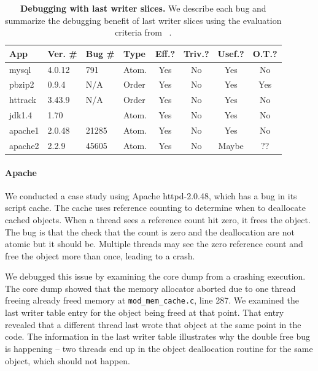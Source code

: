 \documentclass[preprint,9pt]{sigplanconf}
\begin{document}
\begin{table}
\scriptsize
\centering
\begin{tabular}{l|ll|l|ccc|c}
{\bf App} & {\bf Ver. \#} & {\bf Bug \#} &{\bf Type} & {\bf Eff.?} & {\bf Triv.?} & {\bf Usef.?} & {\bf O.T.?}\\ \hline
mysql  &  4.0.12 &  791     & Atom.  &Yes  &No    & Yes   & No  \\%
pbzip2 &  0.9.4  &  N/A     & Order  &Yes  &No    & Yes   & Yes \\
httrack& 3.43.9  &  N/A     & Order  &Yes  &No    & Yes   & No  \\%
jdk1.4 &  1.70   &          & Atom.  &Yes  &No    & Yes   & No  \\%
apache1&  2.0.48 &  21285   & Atom.  &Yes  &No    & Yes   & No  \\%
apache2&  2.2.9  &  45605   & Atom.  &Yes  &No    & Maybe & ??  \\
\end{tabular}
\caption{{\bf Debugging with last writer slices.} We describe each bug and summarize the debugging benefit of last writer slices using the evaluation criteria from ~\cite{badapples}.  }
\normalsize
\end{table}


\paragraph{Apache}
We conducted a case study using Apache httpd-2.0.48, which has a bug in its
script cache. The cache uses reference counting to determine when to deallocate
cached objects.  When a thread sees a reference count hit zero, it frees the
object.  The bug is that the check that the count is zero and the deallocation
are not atomic but it should be.  Multiple threads may see the zero reference
count and free the object more than once, leading to a crash. 

We debugged this issue by examining the core dump from a crashing execution.
The core dump showed that the memory allocator aborted due to one thread
freeing already freed memory at {\tt mod\_mem\_cache.c}, line 287.  We examined
the last writer table entry for the object being freed at that point.  That
entry revealed that a different thread last wrote that object at the same point
in the code.  The information in the last writer table illustrates why the
double free bug is happening -- two threads end up in the object deallocation
routine for the same object, which should not happen.
\end{document}
